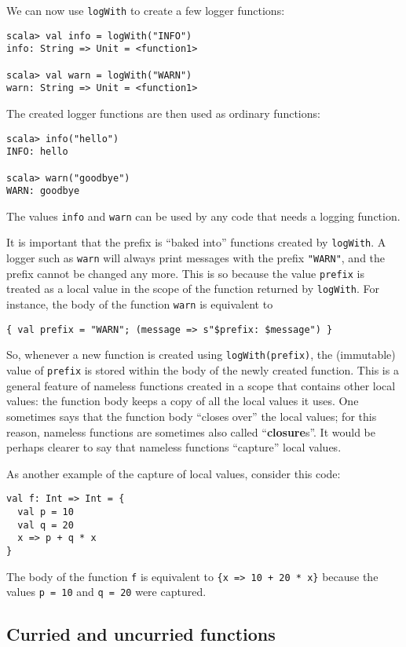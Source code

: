 We can now use \lstinline!logWith! to create a few logger functions:
\begin{lstlisting}
scala> val info = logWith("INFO")
info: String => Unit = <function1>

scala> val warn = logWith("WARN")
warn: String => Unit = <function1>
\end{lstlisting}
The created logger functions are then used as ordinary functions:
\begin{lstlisting}
scala> info("hello")
INFO: hello

scala> warn("goodbye")
WARN: goodbye
\end{lstlisting}
The values \lstinline!info! and \lstinline!warn! can be used by
any code that needs a logging function.

It is important that the prefix is ``baked into'' functions created
by \lstinline!logWith!. A logger such as \lstinline!warn! will always
print messages with the prefix \lstinline!"WARN"!, and the prefix
cannot be changed any more. This is so because the value \lstinline!prefix!
is treated as a local value in the scope of the function returned
by \lstinline!logWith!. For instance, the body of the function \lstinline!warn!
is equivalent to
\begin{lstlisting}
{ val prefix = "WARN"; (message => s"$prefix: $message") }
\end{lstlisting}
So, whenever a new function is created using \lstinline!logWith(prefix)!,
the (immutable) value of \lstinline!prefix! is stored within the
body of the newly created function. This is a general feature of nameless
functions created in a scope that contains other local values: the
function body keeps a copy of all the local values it uses. One sometimes
says that the function body ``closes over'' the local values; for
this reason, nameless functions are sometimes also called ``\textbf{closure}s''.
It would be perhaps clearer to say that nameless functions ``capture''
local values.

As another example of the capture of local values, consider this code:
\begin{lstlisting}
val f: Int => Int = {
  val p = 10
  val q = 20
  x => p + q * x
}
\end{lstlisting}
The body of the function \lstinline!f! is equivalent to \lstinline!{x => 10 + 20 * x}!
because the values \lstinline!p = 10! and \lstinline!q = 20! were
captured.

\subsection{Curried and uncurried functions}

